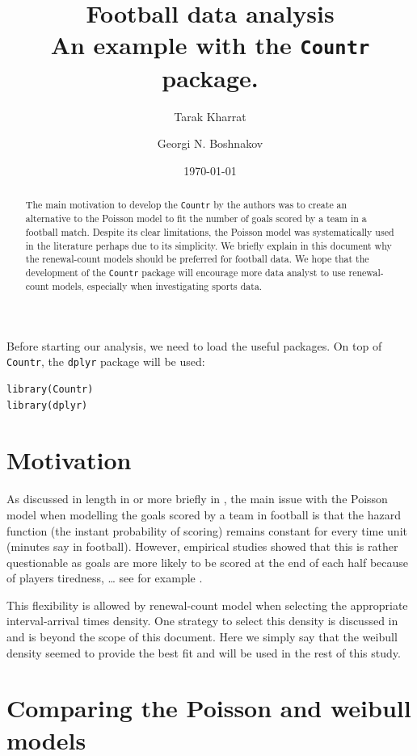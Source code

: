 \documentclass[a4paper,twoside,11pt]{article}
\author[1]{Tarak Kharrat}
\author[2]{Georgi N. Boshnakov}
\affil[1]{Salford Business School, University of Salford, UK.}
\affil[2]{School of Mathematics, University of Manchester, UK.}
\date{\today}
\title{Football data analysis\\\medskip
\large An example with the \texttt{Countr} package.}
\begin{document}
\maketitle
\begin{abstract}
The main motivation to develop the \texttt{Countr} by the authors was to create an
alternative to the Poisson model to fit the number of goals scored by a team in
a football match. Despite its clear limitations, the Poisson model was
systematically used in the literature perhaps due to its simplicity. We briefly
explain in this document why the renewal-count models should be preferred for
football data. We hope that the development of the \texttt{Countr} package will
encourage more data analyst to use renewal-count models, especially when
investigating sports data.
\end{abstract}

Before starting our analysis, we need to load the useful packages. On top of
\texttt{Countr}, the \texttt{dplyr} package \citep{dplyr2016} will be used:
\begin{verbatim}
library(Countr)
library(dplyr)
\end{verbatim}

\section{Motivation}
\label{sec:orgf5bff3a}

As discussed in length in \citet[Chapter 4]{TarakPhd} or more briefly in
\citet{boshnakov2017bivariate}, the main issue with the Poisson model when
modelling the goals scored by a team in football is that the hazard function
(the instant probability of scoring) remains constant for every time unit
(minutes say in football). However, empirical studies showed that this is rather
questionable as goals are more likely to be scored at the end of each half
because of players tiredness, \ldots{} see for example
\citet[Figure~1]{dixon1998birth}. 

This flexibility is allowed by renewal-count model when selecting  the
appropriate interval-arrival times density. One strategy to select this density
is discussed in \citet[Chapter 4]{TarakPhd} and is beyond the scope of this
document. Here we simply say that the weibull density seemed to provide the best
fit and will be used in the rest of this study.

\section{Comparing the Poisson and weibull models}
\label{sec:orge464bbd}
\end{document}
